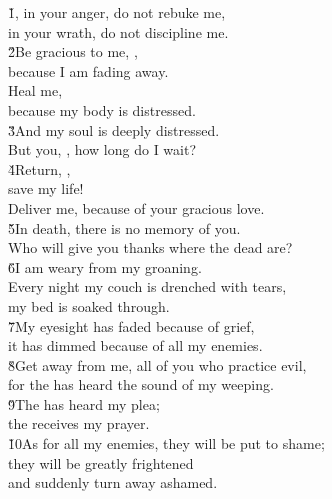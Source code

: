 \begin{poetry}
\poeml \v{1}, in your anger, do not rebuke me, \\
\poemll    in your wrath, do not discipline me. \\
\poeml \v{2}Be gracious to me, , \\
\poemll    because I am fading away. \\
\poeml Heal me, \\
\poemll    because my body is distressed. \\
\poeml \v{3}And my soul is deeply distressed. \\
\poemll    But you, , how long do I wait? \\
\poeml \v{4}Return, , \\
\poemll    save my life! \\
\poemlll       Deliver me, because of your gracious love. \\
\poeml \v{5}In death, there is no memory of you. \\
\poemll    Who will give you thanks where the dead are? \\
\poeml \v{6}I am weary from my groaning. \\
\poemll    Every night my couch is drenched with tears, \\
\poemlll       my bed is soaked through. \\
\poeml \v{7}My eyesight has faded because of grief, \\
\poemll    it has dimmed because of all my enemies. \\
\poeml \v{8}Get away from me, all of you who practice evil, \\
\poemll    for the  has heard the sound of my weeping. \\
\poeml \v{9}The  has heard my plea; \\
\poemll    the  receives my prayer. \\
\poeml \v{10}As for all my enemies, they will be put to shame; \\
\poemll    they will be greatly frightened \\
\poemlll       and suddenly turn away ashamed.
\end{poetry}

